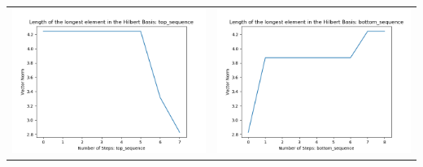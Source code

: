 \documentclass[10pt]{article}
\begin{document}
\begin{tabular}{c|c}
\begin{minipage}{.4\textwidth}
\includegraphics[width=\textwidth]{"DATA/5d/5 generators 2 bound J/top_sequence LENGTH"}
\end{minipage} &
\begin{minipage}{.4\textwidth}
\includegraphics[width=\textwidth]{"DATA/5d/5 generators 2 bound J bottomup/bottom_sequence LENGTH"}
\end{minipage}
\end{tabular}
\end{document}
